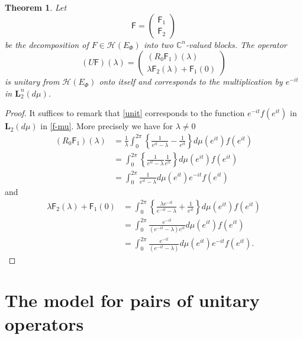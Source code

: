 \documentclass[12pt]{amsart}
\newtheorem{thm}{Theorem}[section]
\theoremstyle{definition}
\theoremstyle{remark}
\numberwithin{equation}{section}
\begin{document}
  \begin{thm}
    Let
    \[
      \mathsf F=\begin{pmatrix} \mathsf F_1\\ \mathsf F_2\end{pmatrix}
          \]
    be the decomposition of $F\in\mathcal H(E_\Phi)$ into two $\mathbb C^n$-valued blocks. The operator
    \begin{equation}
      \label{unit}
      (U\mathsf F)(\lambda)=\begin{pmatrix}(R_0\mathsf F_1)(\lambda)\\ \lambda \mathsf F _2(\lambda)+\mathsf F_1(0)
           \end{pmatrix}
    \end{equation}
      is unitary from $\mathcal H(E_\Phi)$ onto itself and corresponds to the multiplication by $e^{-it}$ in $\mathbf L_2^n(d\mu)$.    \end{thm}
    \begin{proof}
      It suffices to remark that \eqref{unit} corresponds to the function $e^{-it}f(e^{it})$ in $\mathbf L_2(d\mu)$ in \eqref{f-mu}. More precisely we have for $\lambda\not=0$
      \[
        \begin{split}
          (R_0\mathsf F_1)(\lambda)&=\frac{1}{\lambda}\int_0^{2\pi}\left\{\frac{1}{e^{it}-{\lambda}}-\frac{1}{e^{it}}\right\}d\mu(e^{it})f(e^{it})\\
                                   &=\int_0^{2\pi}\left\{\frac{1}{e^{it}-{\lambda}}\frac{1}{e^{it}}\right\}d\mu(e^{it})f(e^{it})\\
                    &=\int_0^{2\pi}\frac{1}{e^{it}-{\lambda}}d\mu(e^{it})e^{-it}f(e^{it})
        \end{split}
      \]
      and
      \[
        \begin{split}
          \lambda\mathsf F_2(\lambda)+\mathsf F_1(0)&=\int_0^{2\pi}\left\{\frac{\lambda e^{-it}}{e^{-it}-\lambda}+\frac{1}{e^{it}}\right\}d\mu(e^{it})f(e^{it})\\
                                                   &=\int_0^{2\pi}\frac{e^{-it}}{(e^{-it}-\lambda)e^{it}}d\mu(e^{it})f(e^{it})\\
                    &=\int_0^{2\pi}\frac{e^{-it}}{(e^{-it}-\lambda)}d\mu(e^{it})e^{-it}f(e^{it}).
        \end{split}
        \]
      \end{proof}
\section{The model for pairs of unitary operators}
\setcounter{equation}{0}
\label{sec-3}
\end{document}
